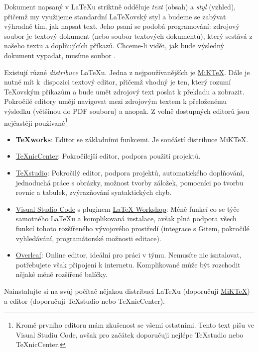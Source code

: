 \documentclass[a4paper,11pt,twoside]{article}
\begin{document}
    Dokument napsaný v \LaTeX{}u striktně odděluje \emph{text} (obsah) a \emph{styl} (vzhled), přičemž my využijeme standardní \LaTeX{}ovský styl a budeme se zabývat výhradně tím, jak napsat text.
    Jeho psaní se podobá programování: zdrojový soubor je textový dokument (nebo soubor textových dokumentů), který sestává z našeho textu a doplňujících příkazů.
    Chceme-li vidět, jak bude výsledný dokument vypadat, musíme soubor .

    Existují různé \emph{distribuce} \LaTeX{}u.
    Jedna z nejpoužívanějších je \href{https://miktex.org/}{MiKTeX}.
    Dále je nutné mít k~dispozici textový editor, přičemž vhodný je ten, který rozumí \TeX{}ovským příkazům a bude umět zdrojový text poslat k překladu a zobrazit.
    Pokročilé editory umějí navigovat mezi zdrojovým textem k přeloženému výsledku (většinou do PDF souboru) a naopak.
    Z volně dostupných editorů jsou nejčastěji používané\footnote{Kromě prvního editoru mám zkušenost se všemi ostatními. Tento text píšu ve Visual Studiu Code, avšak pro začátek doporučuji nejlépe TeXstudio nebo TeXnicCenter.}
    \begin{itemize}
        \item {\bf TeXworks}: Editor se základními funkcemi. Je součástí distribuce MiKTeX.
        \item \href{https://www.texniccenter.org/}{TeXnicCenter}: Pokročilejší editor, podpora použití projektů.
        \item \href{https://www.texstudio.org/}{TeXstudio}: Pokročilý editor, podpora projektů, automatického doplňování, jednoduchá práce s obrázky, možnost tvorby záložek, pomocníci po tvorbu rovnic a tabulek, zvýrazňování syntaktických chyb.
        \item \href{https://code.visualstudio.com/}{Visual Studio Code} s pluginem \href{https://marketplace.visualstudio.com/items?itemName=James-Yu.latex-workshop}{LaTeX Workshop}: Méně funkcí co se týče samotného \LaTeX{}u a komplikovaná instalace, avšak plná podpora všech funkcí tohoto rozšířeného vývojového prostředí (integrace s Gitem, pokročilé vyhledávání, programátorské možnosti editace).
        \item \href{https://www.overleaf.com/}{Overleaf}: Online editor, ideální pro práci v týmu. 
            Nemusíte nic isntalovat, potřebujete však připojení k internetu. 
            Komplikované může být rozchodit nějaké méně rozšířené balíčky. 
    \end{itemize}

    \begin{task}
        Nainstalujte si na svůj počítač nějakou distribuci \LaTeX{}u (doporučuji \href{https://miktex.org/}{MiKTeX}) a editor (doporučuji TeXstudio nebo TeXnicCenter).
    \end{task}
\end{document}
